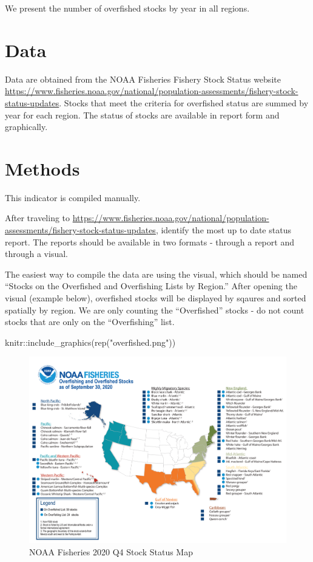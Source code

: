 \documentclass[
]{book}
\newenvironment{Shaded}{\begin{snugshade}}{\end{snugshade}}
\newcommand{\FunctionTok}[1]{\textcolor[rgb]{0.00,0.00,0.00}{#1}}
\newcommand{\NormalTok}[1]{#1}
\newcommand{\SpecialCharTok}[1]{\textcolor[rgb]{0.00,0.00,0.00}{#1}}
\newcommand{\StringTok}[1]{\textcolor[rgb]{0.31,0.60,0.02}{#1}}
\begin{document}
We present the number of overfished stocks by year in all regions.

\hypertarget{data-4}{%
\section{Data}\label{data-4}}

Data are obtained from the NOAA Fisheries Fishery Stock Status website \url{https://www.fisheries.noaa.gov/national/population-assessments/fishery-stock-status-updates}. Stocks that meet the criteria for overfished status are summed by year for each region. The status of stocks are available in report form and graphically.

\hypertarget{methods-4}{%
\section{Methods}\label{methods-4}}

This indicator is compiled manually.

After traveling to \url{https://www.fisheries.noaa.gov/national/population-assessments/fishery-stock-status-updates}, identify the most up to date status report. The reports should be available in two formats - through a report and through a visual.

The easiest way to compile the data are using the visual, which should be named ``Stocks on the Overfished and Overfishing Lists by Region.'' After opening the visual (example below), overfished stocks will be displayed by sqaures and sorted spatially by region. We are only counting the ``Overfished'' stocks - do not count stocks that are only on the ``Overfishing'' list.

\begin{Shaded}
\begin{Highlighting}[]
\NormalTok{knitr}\SpecialCharTok{::}\FunctionTok{include\_graphics}\NormalTok{(}\FunctionTok{rep}\NormalTok{(}\StringTok{"overfished.png"}\NormalTok{))}
\end{Highlighting}
\end{Shaded}

\begin{figure}
\includegraphics[width=38.39in]{overfished} \caption{NOAA Fisheries 2020 Q4 Stock Status Map}\label{fig:unnamed-chunk-4}
\end{figure}
\end{document}
